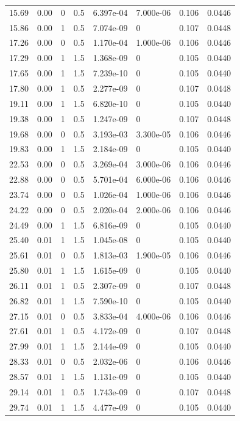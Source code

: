 \documentclass[preview]{standalone}
\begin{document}
{{\begin{tabular}{L{1.2cm}C{1.2cm} C{0.3cm}C{0.5cm} C{1.4cm}C{1.4cm} C{1.4cm}C{1.4cm}}
  15.69  &  0.00  & 0     & 0.5 &  6.397e-04  & 7.000e-06  & 0.106 &  0.0446   \\ 
  15.86  &  0.00  & 1     & 0.5 &  7.074e-09  & 0  & 0.107 &  0.0448   \\ 
  17.26  &  0.00  & 0     & 0.5 &  1.170e-04  & 1.000e-06  & 0.106 &  0.0446   \\ 
  17.29  &  0.00  & 1     & 1.5 &  1.368e-09  & 0  & 0.105 &  0.0440   \\ 
  17.65  &  0.00  & 1     & 1.5 &  7.239e-10  & 0  & 0.105 &  0.0440   \\ 
  17.80  &  0.00  & 1     & 0.5 &  2.277e-09  & 0  & 0.107 &  0.0448   \\ 
  19.11  &  0.00  & 1     & 1.5 &  6.820e-10  & 0  & 0.105 &  0.0440   \\ 
  19.38  &  0.00  & 1     & 0.5 &  1.247e-09  & 0  & 0.107 &  0.0448   \\ 
  19.68  &  0.00  & 0     & 0.5 &  3.193e-03  & 3.300e-05  & 0.106 &  0.0446   \\ 
  19.83  &  0.00  & 1     & 1.5 &  2.184e-09  & 0  & 0.105 &  0.0440   \\ 
  22.53  &  0.00  & 0     & 0.5 &  3.269e-04  & 3.000e-06  & 0.106 &  0.0446   \\ 
  22.88  &  0.00  & 0     & 0.5 &  5.701e-04  & 6.000e-06  & 0.106 &  0.0446   \\ 
  23.74  &  0.00  & 0     & 0.5 &  1.026e-04  & 1.000e-06  & 0.106 &  0.0446   \\ 
  24.22  &  0.00  & 0     & 0.5 &  2.020e-04  & 2.000e-06  & 0.106 &  0.0446   \\ 
  24.49  &  0.00  & 1     & 1.5 &  6.816e-09  & 0  & 0.105 &  0.0440   \\ 
  25.40  &  0.01  & 1     & 1.5 &  1.045e-08  & 0  & 0.105 &  0.0440   \\ 
  25.61  &  0.01  & 0     & 0.5 &  1.813e-03  & 1.900e-05  & 0.106 &  0.0446   \\ 
  25.80  &  0.01  & 1     & 1.5 &  1.615e-09  & 0  & 0.105 &  0.0440   \\ 
  26.11  &  0.01  & 1     & 0.5 &  2.307e-09  & 0  & 0.107 &  0.0448   \\ 
  26.82  &  0.01  & 1     & 1.5 &  7.590e-10  & 0  & 0.105 &  0.0440   \\ 
  27.15  &  0.01  & 0     & 0.5 &  3.833e-04  & 4.000e-06  & 0.106 &  0.0446   \\ 
  27.61  &  0.01  & 1     & 0.5 &  4.172e-09  & 0  & 0.107 &  0.0448   \\ 
  27.99  &  0.01  & 1     & 1.5 &  2.144e-09  & 0  & 0.105 &  0.0440   \\ 
  28.33  &  0.01  & 0     & 0.5 &  2.032e-06  & 0  & 0.106 &  0.0446   \\ 
  28.57  &  0.01  & 1     & 1.5 &  1.131e-09  & 0  & 0.105 &  0.0440   \\ 
  29.14  &  0.01  & 1     & 0.5 &  1.743e-09  & 0  & 0.107 &  0.0448   \\ 
  29.74  &  0.01  & 1     & 1.5 &  4.477e-09  & 0  & 0.105 &  0.0440   \\ 
\hline 
\end{tabular} 

}}
\end{document}
